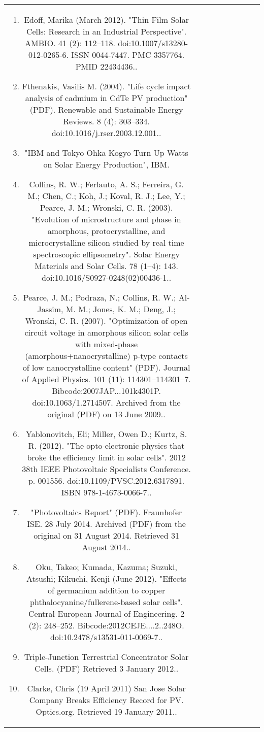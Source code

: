 \begin{table}[ht]
\begin{tabular}{|c|c|c|c|c|c|c|c|c}
\begin{enumerate}
\item Edoff, Marika (March 2012). "Thin Film Solar Cells: Research in an Industrial Perspective". AMBIO. 41 (2): 112–118. doi:10.1007/s13280-012-0265-6. ISSN 0044-7447. PMC 3357764. PMID 22434436..
\item Fthenakis, Vasilis M. (2004). "Life cycle impact analysis of cadmium in CdTe PV production" (PDF). Renewable and Sustainable Energy Reviews. 8 (4): 303–334. doi:10.1016/j.rser.2003.12.001..
\item "IBM and Tokyo Ohka Kogyo Turn Up Watts on Solar Energy Production", IBM.
\item Collins, R. W.; Ferlauto, A. S.; Ferreira, G. M.; Chen, C.; Koh, J.; Koval, R. J.; Lee, Y.; Pearce, J. M.; Wronski, C. R. (2003). "Evolution of microstructure and phase in amorphous, protocrystalline, and microcrystalline silicon studied by real time spectroscopic ellipsometry". Solar Energy Materials and Solar Cells. 78 (1–4): 143. doi:10.1016/S0927-0248(02)00436-1..
\item Pearce, J. M.; Podraza, N.; Collins, R. W.; Al-Jassim, M. M.; Jones, K. M.; Deng, J.; Wronski, C. R. (2007). "Optimization of open circuit voltage in amorphous silicon solar cells with mixed-phase (amorphous+nanocrystalline) p-type contacts of low nanocrystalline content" (PDF). Journal of Applied Physics. 101 (11): 114301–114301–7. Bibcode:2007JAP...101k4301P. doi:10.1063/1.2714507. Archived from the original (PDF) on 13 June 2009..
\item Yablonovitch, Eli; Miller, Owen D.; Kurtz, S. R. (2012). "The opto-electronic physics that broke the efficiency limit in solar cells". 2012 38th IEEE Photovoltaic Specialists Conference. p. 001556. doi:10.1109/PVSC.2012.6317891. ISBN 978-1-4673-0066-7..
\item "Photovoltaics Report" (PDF). Fraunhofer ISE. 28 July 2014. Archived (PDF) from the original on 31 August 2014. Retrieved 31 August 2014..
\item Oku, Takeo; Kumada, Kazuma; Suzuki, Atsushi; Kikuchi, Kenji (June 2012). "Effects of germanium addition to copper phthalocyanine/fullerene-based solar cells". Central European Journal of Engineering. 2 (2): 248–252. Bibcode:2012CEJE....2..248O. doi:10.2478/s13531-011-0069-7..
\item Triple-Junction Terrestrial Concentrator Solar Cells. (PDF) Retrieved 3 January 2012..
\item Clarke, Chris (19 April 2011) San Jose Solar Company Breaks Efficiency Record for PV. Optics.org. Retrieved 19 January 2011..

\end{enumerate}
\end{tabular}
\end{table}
